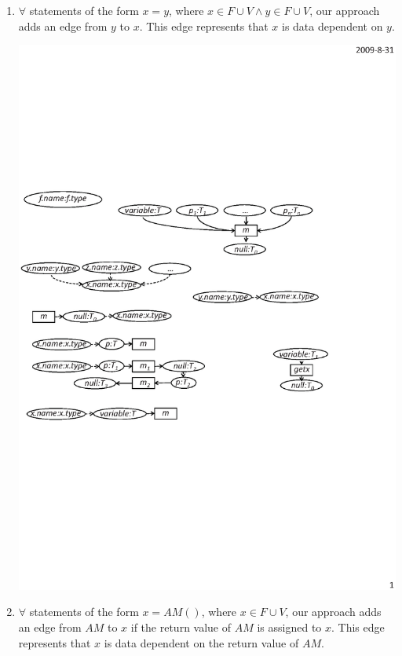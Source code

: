 \begin{enumerate}
\item $\forall$ statements of the form $x = y$, where $x \in F \cup V \wedge y \in F \cup V$,
our approach adds an edge from $y$ to $x$. This edge represents that
$x$ is data dependent on $y$.\vspace*{-1.5ex}
\begin{center}
\includegraphics[scale=0.7,clip]{figure/rule4.eps}%
\end{center}\vspace*{-1.5ex}
\item $\forall$ statements of the form $x = AM()$, where $x \in F \cup V$, our approach
adds an edge from $AM$ to $x$ if the return value of $AM$ is
assigned to $x$. This edge represents that $x$ is data dependent on
the return value of $AM$. \vspace*{-1.5ex}

\end{enumerate}
